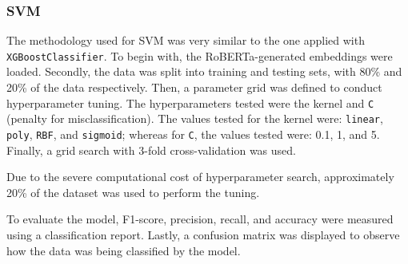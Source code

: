 \subsubsection{SVM}

The methodology used for SVM was very similar to the one applied with \texttt{XGBoostClassifier}. To begin with, the RoBERTa-generated embeddings were loaded. Secondly, the data was split into training and testing sets, with 80\% and 20\% of the data respectively. Then, a parameter grid was defined to conduct hyperparameter tuning. The hyperparameters tested were the kernel and \texttt{C} (penalty for misclassification). The values tested for the kernel were: \texttt{linear}, \texttt{poly}, \texttt{RBF}, and \texttt{sigmoid}; whereas for \texttt{C}, the values tested were: 0.1, 1, and 5. Finally, a grid search with 3-fold cross-validation was used.

Due to the severe computational cost of hyperparameter search, approximately 20\% of the dataset was used to perform the tuning.

To evaluate the model, F1-score, precision, recall, and accuracy were measured using a classification report. Lastly, a confusion matrix was displayed to observe how the data was being classified by the model.